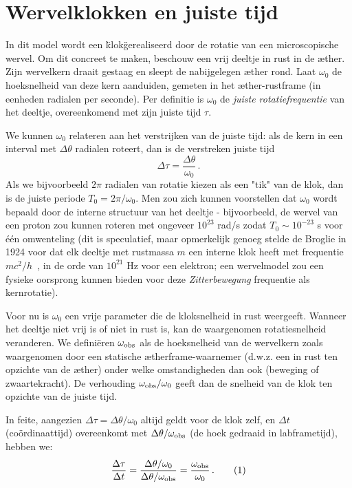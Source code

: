 \section{Wervelklokken en juiste tijd}

In dit model wordt een \"klok\" gerealiseerd door de rotatie van een microscopische wervel. Om dit concreet te maken, beschouw een vrij deeltje in rust in de æther. Zijn wervelkern draait gestaag en sleept de nabijgelegen æther rond. Laat $\omega_0$ de hoeksnelheid van deze kern aanduiden, gemeten in het æther-rustframe (in eenheden radialen per seconde). Per definitie is $\omega_0$ de \emph{juiste rotatiefrequentie} van het deeltje, overeenkomend met zijn juiste tijd $\tau$.

We kunnen $\omega_0$ relateren aan het verstrijken van de juiste tijd: als de kern in een interval met $\Delta \theta$ radialen roteert, dan is de verstreken juiste tijd
\[
    \Delta \tau = \frac{\Delta \theta}{\omega_0} \,.
\]
Als we bijvoorbeeld $2\pi$ radialen van rotatie kiezen als een "tik" van de klok, dan is de juiste periode $T_0 = 2\pi/\omega_0$. Men zou zich kunnen voorstellen dat $\omega_0$ wordt bepaald door de interne structuur van het deeltje - bijvoorbeeld, de wervel van een proton zou kunnen roteren met ongeveer $10^{23}$ rad/s zodat $T_0 \sim 10^{-23}$ s voor één omwenteling (dit is speculatief, maar opmerkelijk genoeg stelde de Broglie in 1924 voor dat elk deeltje met rustmassa $m$ een interne klok heeft met frequentie $mc^2/h$~\cite{deBroglie1924-frequency}, in de orde van $10^{21}$ Hz voor een elektron; een wervelmodel zou een fysieke oorsprong kunnen bieden voor deze \emph{Zitterbewegung} frequentie als kernrotatie).

Voor nu is $\omega_0$ een vrije parameter die de kloksnelheid in rust weergeeft. Wanneer het deeltje niet vrij is of niet in rust is, kan de waargenomen rotatiesnelheid veranderen. We definiëren $\omega_{\rm obs}$ als de hoeksnelheid van de wervelkern zoals waargenomen door een statische ætherframe-waarnemer (d.w.z. een in rust ten opzichte van de æther) onder welke omstandigheden dan ook (beweging of zwaartekracht). De verhouding $\omega_{\rm obs}/\omega_0$ geeft dan de snelheid van de klok ten opzichte van de juiste tijd.

In feite, aangezien $\Delta \tau = \Delta \theta / \omega_0$ altijd geldt voor de klok zelf, en $\Delta t$ (coördinaattijd) overeenkomt met $\Delta \theta / \omega_{\rm obs}$ (de hoek gedraaid in labframetijd), hebben we:
\[
    \frac{\Delta \tau}{\Delta t} = \frac{\Delta \theta / \omega_0}{\Delta \theta / \omega_{\rm obs}} = \frac{\omega_{\rm obs}}{\omega_0} \,. \tag{1}
\]

